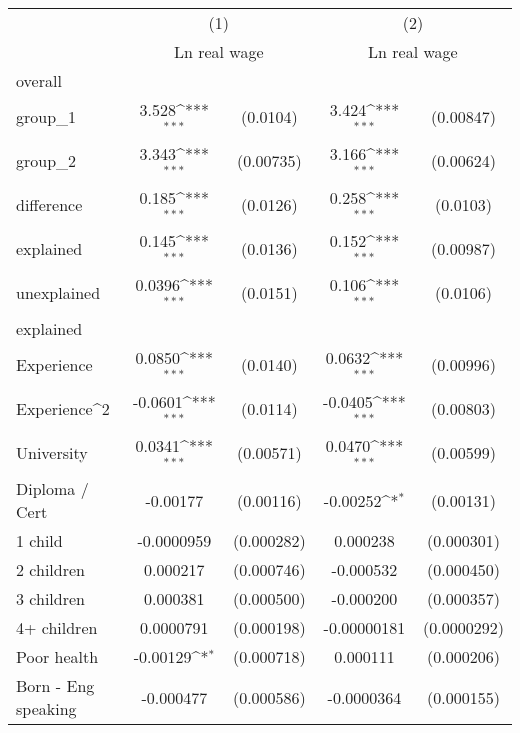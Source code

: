 {
\def\sym#1{\ifmmode^{#1}\else\(^{#1}\)\fi}
\begin{tabular}{l*{2}{cc}}
\hline\hline
                    &\multicolumn{2}{c}{(1)}           &\multicolumn{2}{c}{(2)}           \\
                    &\multicolumn{2}{c}{Ln real wage}  &\multicolumn{2}{c}{Ln real wage}  \\
\hline
overall             &                     &            &                     &            \\
group\_1             &       3.528\sym{***}&    (0.0104)&       3.424\sym{***}&   (0.00847)\\
group\_2             &       3.343\sym{***}&   (0.00735)&       3.166\sym{***}&   (0.00624)\\
difference          &       0.185\sym{***}&    (0.0126)&       0.258\sym{***}&    (0.0103)\\
explained           &       0.145\sym{***}&    (0.0136)&       0.152\sym{***}&   (0.00987)\\
unexplained         &      0.0396\sym{***}&    (0.0151)&       0.106\sym{***}&    (0.0106)\\
\hline
explained           &                     &            &                     &            \\
Experience          &      0.0850\sym{***}&    (0.0140)&      0.0632\sym{***}&   (0.00996)\\
Experience^{2}      &     -0.0601\sym{***}&    (0.0114)&     -0.0405\sym{***}&   (0.00803)\\
University          &      0.0341\sym{***}&   (0.00571)&      0.0470\sym{***}&   (0.00599)\\
Diploma / Cert      &    -0.00177         &   (0.00116)&    -0.00252\sym{*}  &   (0.00131)\\
1 child             &  -0.0000959         &  (0.000282)&    0.000238         &  (0.000301)\\
2 children          &    0.000217         &  (0.000746)&   -0.000532         &  (0.000450)\\
3 children          &    0.000381         &  (0.000500)&   -0.000200         &  (0.000357)\\
4+ children         &   0.0000791         &  (0.000198)& -0.00000181         & (0.0000292)\\
Poor health         &    -0.00129\sym{*}  &  (0.000718)&    0.000111         &  (0.000206)\\
Born - Eng speaking &   -0.000477         &  (0.000586)&  -0.0000364         &  (0.000155)\\

\end{tabular}}
